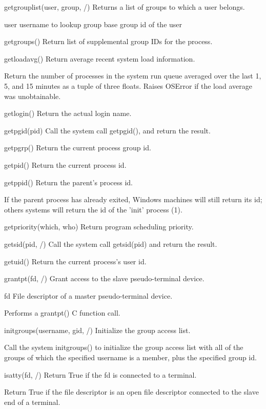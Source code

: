 \documentclass{article}
\begin{document}
    getgrouplist(user, group, /)
        Returns a list of groups to which a user belongs.

        user
          username to lookup
        group
          base group id of the user

    getgroups()
        Return list of supplemental group IDs for the process.

    getloadavg()
        Return average recent system load information.

        Return the number of processes in the system run queue averaged over
        the last 1, 5, and 15 minutes as a tuple of three floats.
        Raises OSError if the load average was unobtainable.

    getlogin()
        Return the actual login name.

    getpgid(pid)
        Call the system call getpgid(), and return the result.

    getpgrp()
        Return the current process group id.

    getpid()
        Return the current process id.

    getppid()
        Return the parent's process id.

        If the parent process has already exited, Windows machines will still
        return its id; others systems will return the id of the 'init' process (1).

    getpriority(which, who)
        Return program scheduling priority.

    getsid(pid, /)
        Call the system call getsid(pid) and return the result.

    getuid()
        Return the current process's user id.

    grantpt(fd, /)
        Grant access to the slave pseudo-terminal device.

          fd
            File descriptor of a master pseudo-terminal device.

        Performs a grantpt() C function call.

    initgroups(username, gid, /)
        Initialize the group access list.

        Call the system initgroups() to initialize the group access list with all of
        the groups of which the specified username is a member, plus the specified
        group id.

    isatty(fd, /)
        Return True if the fd is connected to a terminal.

        Return True if the file descriptor is an open file descriptor
        connected to the slave end of a terminal.
\end{document}

